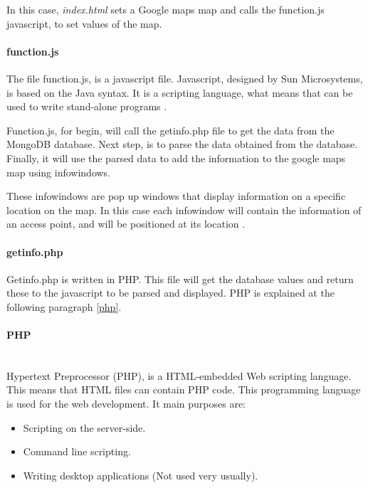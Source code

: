 \documentclass[12pt, a4paper,twoside]{tesi_upf}
\begin{document}
In this case, \emph{index.html} sets a Google maps map and calls the function.js javascript, to set values of the map.

                \paragraph{function.js}
                The file function.js, is a javascript file. Javascript, designed by Sun Microsystems, is based on the Java syntax. It is a scripting language, what means that can be used to write stand-alone programs \cite{javascript}.
                
       Function.js, for begin, will call the getinfo.php file to get the data from the MongoDB database. Next step, is to parse the data obtained from the database. Finally, it will use the parsed data to add the information to the google maps map using infowindows.
       
       These infowindows are pop up windows that display information on a specific location on the map. In this case each infowindow will contain the information of an access point, and will be positioned at its location \cite{infowindow}.
                
                \paragraph{getinfo.php}
                Getinfo.php is written in PHP. This file will get the database values and return these to the javascript to be parsed and displayed. PHP is explained at the following paragraph \ref{php}.\\
                
                \paragraph{PHP}\\
                \label{php}
                Hypertext Preprocessor (PHP), is a HTML-embedded Web scripting language. This means that HTML files can contain PHP code. This programming language is used for the web development. It main purposes are:
                \begin{itemize}
                \item{Scripting on the server-side.}
                \item{Command line scripting.}
                \item{Writing desktop applications (Not used very usually).}
                \end{itemize}\\
                
\end{document}
